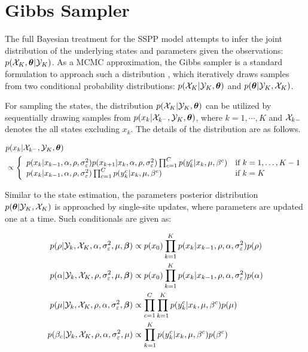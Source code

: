 \documentclass{article}
\begin{document}
\section{Gibbs Sampler}

The full Bayesian treatment for the SSPP model attempts to infer the joint distribution of the
underlying states and parameters given the observations: $p(\mathcal{X}_{K},{\bm \theta}|\mathcal{Y}_{K})$. As a MCMC
approximation, the Gibbs sampler
is a standard formulation to approach such a distribution \cite{Carter_1994,Geweke_2001}, which
iteratively draws samples
from two conditional probability distributions: $p(\mathcal{X}_{K}|\mathcal{Y}_{K},{\bm \theta})$ and $p({\bm \theta}|\mathcal{Y}_{K},\mathcal{X}_{K})$.

For sampling the states, the distribution $p(\mathcal{X}_{K}|\mathcal{Y}_{K},{\bm \theta})$ can be utilized
by sequentially drawing samples from $p(x_{k}|\mathcal{X}_{k^{-}},\mathcal{Y}_{K},{\bm \theta})$, where $k=1,\cdots,K$ and
$\mathcal{X}_{k{-}}$ denotes the all states excluding  $x_{k}$. The details of the distribution are as follows.

\begin{align}
	&p(x_{k}|\mathcal{X}_{k^{-}},\mathcal{Y}_{K},{\bm \theta}) \\ \nonumber
	&\propto \left\{
	\begin{array}{ll}
		p(x_{k}|x_{k-1},\alpha,\rho,\sigma^{2}_{\varepsilon})
		p(x_{k+1}|x_{k},\alpha,\rho,\sigma^{2}_{\varepsilon}) 	
		\prod^{C}_{c=1}p(y^{c}_{k}|x_{k},\mu,\beta^c) & \textrm{if
		$k=1,\ldots,K-1$} \nonumber \\
		p(x_{k}|x_{k-1},\alpha,\rho,\sigma^{2}_{\varepsilon})
		\prod^{C}_{c=1}p(y^{c}_{k}|x_{k},\mu,\beta^c) & \textrm{if $k=K$}
	\end{array}\right.
\end{align}

Similar to the state estimation, the parameters posterior distribution $p({\bm \theta}|\mathcal{Y}_{K},\mathcal{X}_{K})$
is approached by single-site updates, where parameters are updated one at a time.
Such conditionals are given as:

\begin{align}
	p(\rho|\mathcal{Y}_{k},\mathcal{X}_{K},\alpha,\sigma^{2}_{\varepsilon},\mu,{\bm \beta}) &\propto
	p(x_{0})\prod^{K}_{k=1}p(x_{k}|x_{k-1},\rho,\alpha,\sigma^{2}_{\varepsilon})p(\rho) \\
	p(\alpha|\mathcal{Y}_{k},\mathcal{X}_{K},\rho,\sigma^{2}_{\varepsilon},\mu,{\bm \beta}) &\propto
	p(x_{0})\prod^{K}_{k=1}p(x_{k}|x_{k-1},\rho,\alpha,\sigma^{2}_{\varepsilon})p(\alpha)\\
	p(\mu|\mathcal{Y}_{k},\mathcal{X}_{K},\rho,\alpha,\sigma^{2}_{\varepsilon},{\bm \beta}) &\propto
	\prod^{C}_{c=1}\prod^{K}_{k=1}p(y^{c}_{k}|x_{k},\mu,\beta^{c})p(\mu) \\
	p(\beta_{c}|\mathcal{Y}_{k},\mathcal{X}_{K},\rho,\alpha,\sigma^{2}_{\varepsilon},\mu) &\propto
	\prod^{K}_{k=1}p(y^{c}_{k}|x_{k},\mu,\beta^{c})p(\beta^{c})
\end{align}
\end{document}

